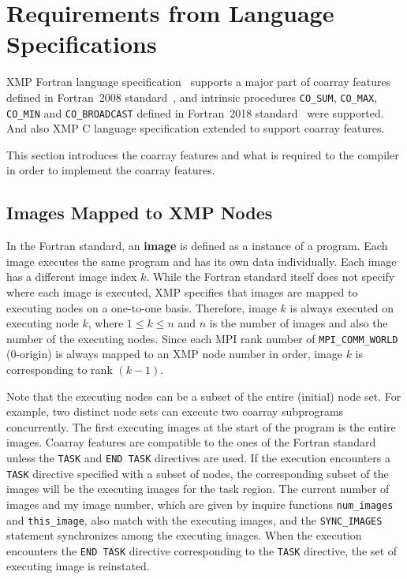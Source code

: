 \section{Requirements from Language Specifications}\label{sec:spec}

XMP Fortran language specification~\cite{xmp} supports a major part of 
coarray features defined in Fortran~2008 standard~\cite{coarray}, 
and intrinsic procedures {\tt CO\_SUM}, {\tt CO\_MAX}, {\tt CO\_MIN} and 
{\tt CO\_BROADCAST} defined in Fortran~2018 standard~\cite{coarray18} were supported.
And also XMP C language specification extended to support coarray features.

This section introduces the coarray features and what is required
to the compiler in order to implement the coarray features.


\subsection{Images Mapped to XMP Nodes}\label{sec:spec-image}

In the Fortran standard, an {\bf image} is defined as a instance of a program. 
Each image executes the same program and has its own data individually.
Each image has a different image index $k$.
While the Fortran standard itself does not specify where each image is executed, 
XMP specifies that images are mapped to executing nodes on a one-to-one basis.
Therefore, image $k$ is always executed on executing node $k$, where $1 \leq k \leq n$ and 
$n$ is the number of images and also the number of the executing nodes. 
Since each MPI rank number of {\tt MPI\_COMM\_WORLD} (0-origin) is 
always mapped to an XMP node number in order, image $k$ is corresponding to 
rank $(k - 1)$.

Note that the executing nodes can be a subset of the entire (initial) node set. 
For example, two distinct node sets can execute two coarray subprograms concurrently.
The first executing images at the start of the program is the entire images.
Coarray features are compatible to the ones of the Fortran standard unless 
the {\tt TASK} and {\tt END TASK} directives are used.
If the execution encounters a {\tt TASK} directive specified with a subset of nodes, 
the corresponding subset of the images will be the executing images for the task region. 
The current number of images and my image number, which are given by inquire functions
{\tt num\_images} and {\tt this\_image}, also match with the executing images, and
the {\tt SYNC\_IMAGES} statement synchronizes among the executing images.
When the execution encounters the {\tt END TASK} directive corresponding to the
{\tt TASK} directive, the set of executing image is reinstated.

